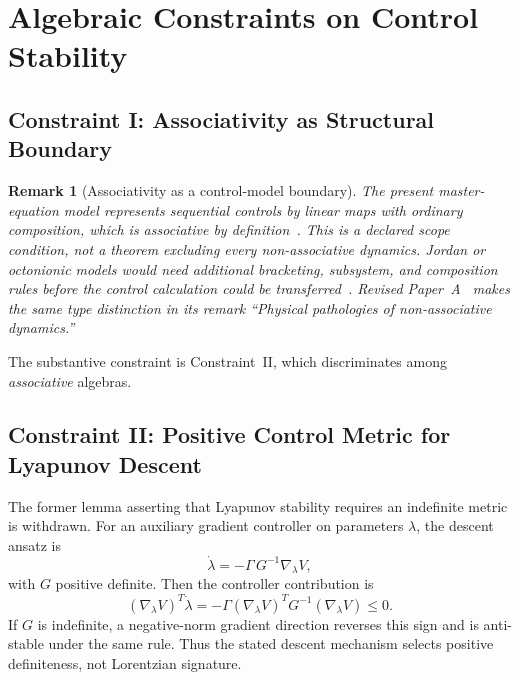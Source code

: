 \documentclass[aps,pre,onecolumn,superscriptaddress,floatfix,longbibliography]{revtex4-2}
\newtheorem{remark}[theorem]{Remark}
\begin{document}
\section{Algebraic Constraints on Control Stability}
\label{sec:stability}

\subsection{Constraint I: Associativity as Structural Boundary}
\label{sec:assoc}

\begin{remark}[Associativity as a control-model boundary]
\label{rem:assoc-boundary}
The present master-equation model represents sequential controls by linear maps with ordinary composition, which is associative by definition~\cite{Breuer2002}.  This is a declared scope condition, not a theorem excluding every non-associative dynamics.  Jordan or octonionic models would need additional bracketing, subsystem, and composition rules before the control calculation could be transferred~\cite{Schafer1966,Gunaydin1973}.  Revised Paper~A~\cite{Liu2026QRAIF_A} makes the same type distinction in its remark ``Physical pathologies of non-associative dynamics.''
\end{remark}

The substantive constraint is Constraint~II, which discriminates among \emph{associative} algebras.

\subsection{Constraint II: Positive Control Metric for Lyapunov Descent}
\label{sec:metric}

The former lemma asserting that Lyapunov stability requires an indefinite metric is withdrawn.  For an auxiliary gradient controller on parameters $\lambda$, the descent ansatz is
\begin{equation}
\dot{\lambda} = -\Gamma\, G^{-1} \nabla_\lambda V,
\label{eq:gradient}
\end{equation}
with $G$ positive definite.  Then the controller contribution is
\begin{equation}
(\nabla_\lambda V)^T\dot\lambda
=-\Gamma(\nabla_\lambda V)^TG^{-1}(\nabla_\lambda V)\leq0.
\end{equation}
If $G$ is indefinite, a negative-norm gradient direction reverses this sign and is anti-stable under the same rule.  Thus the stated descent mechanism selects positive definiteness, not Lorentzian signature.
\end{document}
